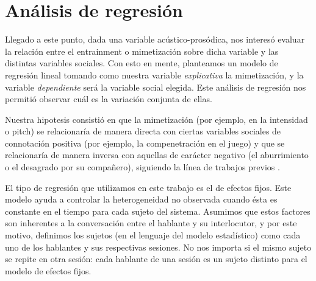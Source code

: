 \section{Análisis de regresión}

Llegado a este punto, dada una variable acústico-prosódica, nos interesó evaluar la relación entre el entrainment o mimetización sobre dicha variable y las distintas variables sociales. Con esto en mente, planteamos un modelo de regresión lineal tomando como nuestra variable \emph{explicativa} la mimetización, y la variable \emph{dependiente} será la variable social elegida. Este análisis de regresión nos permitió observar cuál es la variación conjunta de ellas.

Nuestra hipotesis consistió en que la mimetización (por ejemplo, en la intensidad o pitch) se relacionaría de manera directa con ciertas variables sociales de connotación positiva (por ejemplo, la compenetración en el juego) y que se relacionaría de manera inversa con aquellas de carácter negativo (el aburrimiento o el desagrado por su compañero), siguiendo la línea de trabajos previos \cite{gravano2015backward}.

El tipo de regresión que utilizamos en este trabajo es el de efectos fijos. Este modelo \cite[chap 16]{gujarati1999} ayuda a controlar la heterogeneidad no observada cuando ésta es constante en el tiempo para cada sujeto del sistema. Asumimos que estos factores son inherentes a la conversación entre el hablante y su interlocutor, y por este motivo, definimos los sujetos (en el lenguaje del modelo estadístico) como cada uno de los hablantes y sus respectivas sesiones. No nos importa si el mismo sujeto se repite en otra sesión: cada hablante de una sesión es un sujeto distinto para el modelo de efectos fijos.
